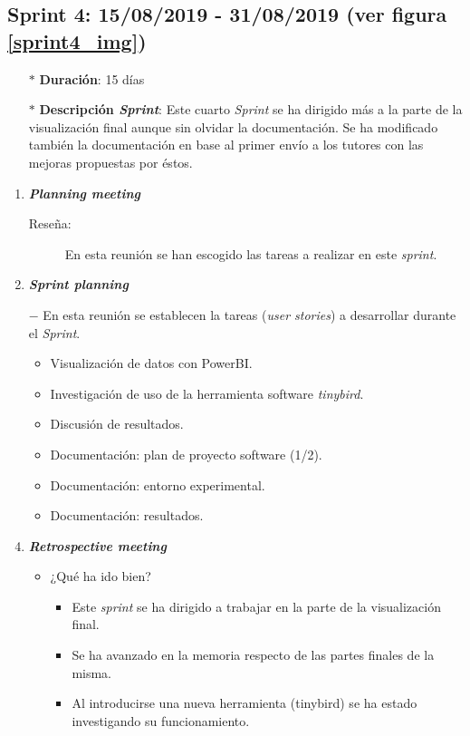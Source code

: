 \subsection{Sprint 4: 15/08/2019 - 31/08/2019 (ver figura \ref{sprint4_img})}\label{sprint4}
\begin{itemize}
	\item[$\ast$] \textbf{Duración}:  15 días
	\item[$\ast$] \textbf{Descripción \textit{Sprint}}: Este cuarto \textit{Sprint} se ha dirigido más a la parte de la visualización final aunque sin olvidar la documentación. Se ha modificado también la documentación en base al primer envío a los tutores con las mejoras propuestas por éstos.
\end{itemize}
\begin{enumerate}
	\item \textbf{\textit{Planning meeting}}
	\begin{description}
		\item[Reseña:] En esta reunión se han escogido las tareas a realizar en este \textit{sprint}.
	\end{description}
	\item \textbf{\textit{Sprint planning}}
	\item[$-$] En esta reunión se establecen la tareas (\textit{user stories}) a desarrollar durante el \textit{Sprint}. 
	\begin{itemize}
		\item Visualización de datos con PowerBI.
		\item Investigación de uso de la herramienta software \textit{tinybird}.
		\item Discusión de resultados.
		\item Documentación: plan de proyecto software (1/2).
		\item Documentación: entorno experimental.
		\item Documentación: resultados.
	\end{itemize}
	\item \textbf{\textit{Retrospective meeting}}
	\begin{itemize}
		\item ¿Qué ha ido bien?
		\begin{itemize}
			\item Este \textit{sprint} se ha dirigido a trabajar en la parte de la visualización final.
			\item Se ha avanzado en la memoria respecto de las partes finales de la misma. 
			\item Al introducirse una nueva herramienta (tinybird) se ha estado investigando su funcionamiento.

\end{itemize}
\end{itemize}
\end{enumerate}
